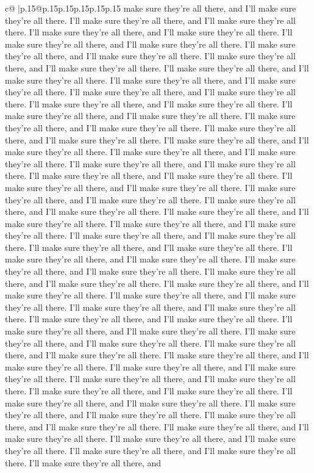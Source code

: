 \documentclass{article}
\begin{document}
{\begin{supertabular}{c@{$\;$}|p{.15\linewidth}@{}p{.15\linewidth}p{.15\linewidth}p{.15\linewidth}p{.15\linewidth}p{.15\linewidth}}
{{{make sure they're all there, and I'll make sure they're all there. I'll make sure they're all there, and I'll make sure they're all there. I'll make sure they're all there, and I'll make sure they're all there. I'll make sure they're all there, and I'll make sure they're all there. I'll make sure they're all there, and I'll make sure they're all there. I'll make sure they're all there, and I'll make sure they're all there. I'll make sure they're all there, and I'll make sure they're all there. I'll make sure they're all there, and I'll make sure they're all there. I'll make sure they're all there, and I'll make sure they're all there. I'll make sure they're all there, and I'll make sure they're all there. I'll make sure they're all there, and I'll make sure they're all there. I'll make sure they're all there, and I'll make sure they're all there. I'll make sure they're all there, and I'll make sure they're all there. I'll make sure they're all there, and I'll make sure they're all there. I'll make sure they're all there, and I'll make sure they're all there. I'll make sure they're all there, and I'll make sure they're all there. I'll make sure they're all there, and I'll make sure they're all there. I'll make sure they're all there, and I'll make sure they're all there. I'll make sure they're all there, and I'll make sure they're all there. I'll make sure they're all there, and I'll make sure they're all there. I'll make sure they're all there, and I'll make sure they're all there. I'll make sure they're all there, and I'll make sure they're all there. I'll make sure they're all there, and I'll make sure they're all there. I'll make sure they're all there, and I'll make sure they're all there. I'll make sure they're all there, and I'll make sure they're all there. I'll make sure they're all there, and I'll make sure they're all there. I'll make sure they're all there, and I'll make sure they're all there. I'll make sure they're all there, and I'll make sure they're all there. I'll make sure they're all there, and I'll make sure they're all there. I'll make sure they're all there, and I'll make sure they're all there. I'll make sure they're all there, and I'll make sure they're all there. I'll make sure they're all there, and I'll make sure they're all there. I'll make sure they're all there, and I'll make sure they're all there. I'll make sure they're all there, and I'll make sure they're all there. I'll make sure they're all there, and I'll make sure they're all there. I'll make sure they're all there, and I'll make sure they're all there. I'll make sure they're all there, and I'll make sure they're all there. I'll make sure they're all there, and I'll make sure they're all there. I'll make sure they're all there, and I'll make sure they're all there. I'll make sure they're all there, and I'll make sure they're all there. I'll make sure they're all there, and I'll make sure they're all there. I'll make sure they're all there, and I'll make sure they're all there. I'll make sure they're all there, and I'll make sure they're all there. I'll make sure they're all there, and I'll make sure they're all there. I'll make sure they're all there, and }}}
\end{supertabular}}
\end{document}
